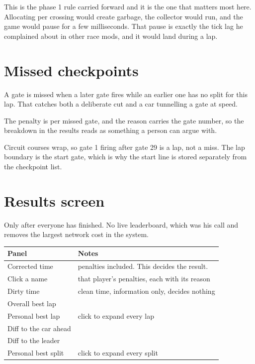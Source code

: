 \documentclass[11pt,a4paper]{article}
\begin{document}
This is the phase 1 rule carried forward and it is the one that matters most
here. Allocating per crossing would create garbage, the collector would run,
and the game would pause for a few milliseconds. That pause is exactly the tick
lag he complained about in other race mods, and it would land during a lap.

\section{Missed checkpoints}

A gate is missed when a later gate fires while an earlier one has no split for
this lap. That catches both a deliberate cut and a car tunnelling a gate at
speed.

The penalty is per missed gate, and the reason carries the gate number, so the
breakdown in the results reads as something a person can argue with.

Circuit courses wrap, so gate 1 firing after gate 29 is a lap, not a miss. The
lap boundary is the start gate, which is why the start line is stored
separately from the checkpoint list.

\section{Results screen}

Only after everyone has finished. No live leaderboard, which was his call and
removes the largest network cost in the system.

\begin{longtable}{@{}ll@{}}
\toprule
\textbf{Panel} & \textbf{Notes} \\
\midrule
\endhead
Corrected time         & penalties included. This decides the result. \\
Click a name           & that player's penalties, each with its reason \\
Dirty time             & clean time, information only, decides nothing \\
Overall best lap       & \\
Personal best lap      & click to expand every lap \\
Diff to the car ahead  & \\
Diff to the leader     & \\
Personal best split    & click to expand every split \\
\bottomrule
\end{longtable}
\end{document}
